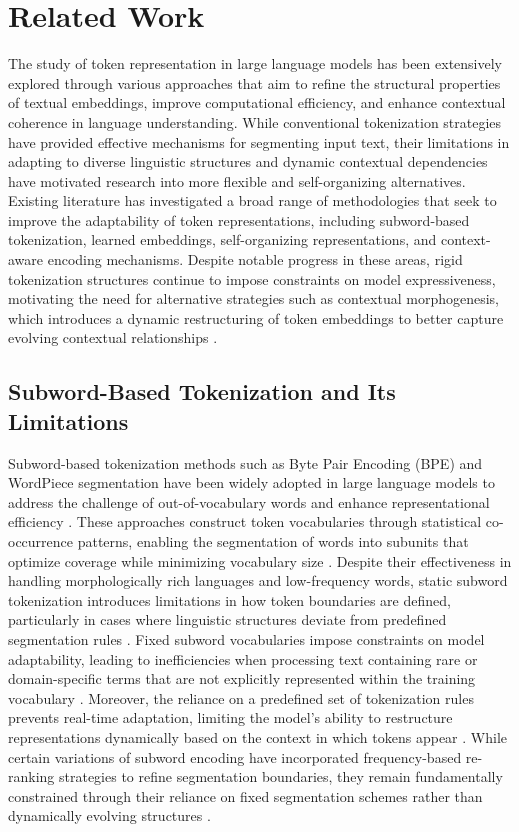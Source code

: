 \documentclass{article}
\begin{document}
\section{Related Work}

The study of token representation in large language models has been extensively explored through various approaches that aim to refine the structural properties of textual embeddings, improve computational efficiency, and enhance contextual coherence in language understanding. While conventional tokenization strategies have provided effective mechanisms for segmenting input text, their limitations in adapting to diverse linguistic structures and dynamic contextual dependencies have motivated research into more flexible and self-organizing alternatives. Existing literature has investigated a broad range of methodologies that seek to improve the adaptability of token representations, including subword-based tokenization, learned embeddings, self-organizing representations, and context-aware encoding mechanisms. Despite notable progress in these areas, rigid tokenization structures continue to impose constraints on model expressiveness, motivating the need for alternative strategies such as contextual morphogenesis, which introduces a dynamic restructuring of token embeddings to better capture evolving contextual relationships \cite{roe2024semantic}.

\subsection{Subword-Based Tokenization and Its Limitations}

Subword-based tokenization methods such as Byte Pair Encoding (BPE) and WordPiece segmentation have been widely adopted in large language models to address the challenge of out-of-vocabulary words and enhance representational efficiency \cite{aturd2024dynamic}. These approaches construct token vocabularies through statistical co-occurrence patterns, enabling the segmentation of words into subunits that optimize coverage while minimizing vocabulary size \cite{zhang2024grounding}. Despite their effectiveness in handling morphologically rich languages and low-frequency words, static subword tokenization introduces limitations in how token boundaries are defined, particularly in cases where linguistic structures deviate from predefined segmentation rules \cite{huang2024measuring}. Fixed subword vocabularies impose constraints on model adaptability, leading to inefficiencies when processing text containing rare or domain-specific terms that are not explicitly represented within the training vocabulary \cite{verscaj2024innovative}. Moreover, the reliance on a predefined set of tokenization rules prevents real-time adaptation, limiting the model’s ability to restructure representations dynamically based on the context in which tokens appear \cite{fouqun2024contextual}. While certain variations of subword encoding have incorporated frequency-based re-ranking strategies to refine segmentation boundaries, they remain fundamentally constrained through their reliance on fixed segmentation schemes rather than dynamically evolving structures \cite{hu2024dynamic}.
\end{document}
